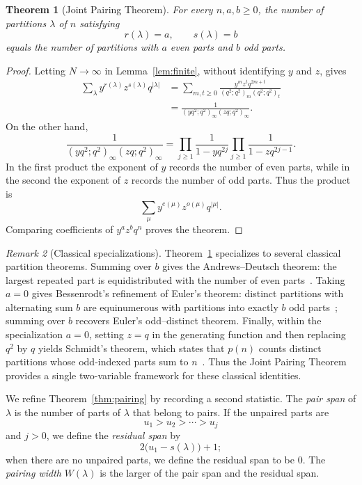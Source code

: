 \documentclass[11pt]{article}
\newtheorem{theorem}{Theorem}[section]
\theoremstyle{definition}
\theoremstyle{remark}
\newtheorem{remark}[theorem]{Remark}
\begin{document}
\begin{theorem}[Joint Pairing Theorem]\label{thm:joint-pairing}
For every $n,a,b\geq0$, the number of partitions $\lambda$ of $n$ satisfying
\[
 r(\lambda)=a,\qquad s(\lambda)=b
\]
equals the number of partitions with $a$ even parts and $b$ odd parts. 
\end{theorem}

\begin{proof}
Letting $N\to\infty$ in Lemma~\ref{lem:finite}, without identifying $y$
and $z$, gives
\begin{align*}
 \sum_{\lambda}y^{r(\lambda)}z^{s(\lambda)}q^{|\lambda|}
 &=\sum_{m,t\geq0}
   \frac{y^mz^tq^{2m+t}}
   {(q^2;q^2)_m(q^2;q^2)_t}\\
 &=\frac{1}{(yq^2;q^2)_\infty(zq;q^2)_\infty}.
\end{align*}
On the other hand,
\[
 \frac{1}{(yq^2;q^2)_\infty(zq;q^2)_\infty}
 =\prod_{j\geq1}\frac{1}{1-yq^{2j}}
  \prod_{j\geq1}\frac{1}{1-zq^{2j-1}}.
\]
In the first product the exponent of $y$ records the number of even parts,
while in the second the exponent of $z$ records the number of odd parts.
Thus the product is
\[
 \sum_{\mu}y^{e(\mu)}z^{o(\mu)}q^{|\mu|}.
\]
Comparing coefficients of $y^az^bq^n$ proves the theorem.
\end{proof}

\begin{remark}[Classical specializations]\label{rem:joint-classical}
Theorem~\ref{thm:joint-pairing} specializes to several classical partition theorems.  Summing over $b$ gives the Andrews--Deutsch theorem: the largest repeated part is equidistributed with the number of even parts~\cite{AndrewsDeutsch2016}.  Taking $a=0$ gives Bessenrodt's refinement of Euler's theorem: distinct partitions with alternating sum $b$ are equinumerous with partitions into exactly $b$ odd parts~\cite{Bessenrodt1994}; summing over $b$ recovers Euler's odd--distinct theorem.  Finally, within the specialization $a=0$, setting $z=q$ in the generating function and then replacing $q^2$ by $q$ yields Schmidt's theorem, which states that $p(n)$ counts distinct partitions whose odd-indexed parts sum to $n$~\cite{AndrewsPaule2022}.  Thus the Joint Pairing Theorem provides a single two-variable framework for these classical identities.
\end{remark}

We refine Theorem~\ref{thm:pairing} by recording a second statistic.  The
\emph{pair span} of $\lambda$ is the number of parts of $\lambda$ that belong
to pairs.  If the unpaired parts are
\[
 u_1>u_2>\cdots>u_j
\]
and $j>0$, we define the \emph{residual span} by
\[
 2\bigl(u_1-s(\lambda)\bigr)+1;
\]
when there are no unpaired parts, we define the residual span to be $0$.  The
\emph{pairing width} $W(\lambda)$ is the larger of the pair span and the
residual span.
\end{document}
